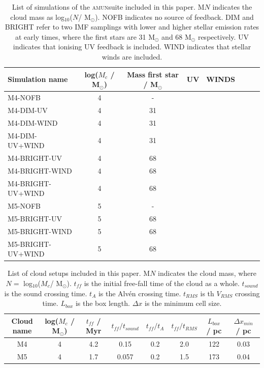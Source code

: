 \documentclass[a4paper,fleqn,usenatbib]{mnras}
\newcommand{\Msolar}{M$_{\odot}$\xspace}
\newcommand{\AMUN}{\textsc{amun}}
\newcommand{\tick}{\hspace{1pt}\ding{51}}
\newcommand{\cross}{\hspace{1pt}\ding{55}}
\begin{document}
\begin{table}
	\centering
	\caption{List of simulations of the \AMUN suite included in this paper. M$N$ indicates the cloud mass as log$_{10}$($N$/ \Msolar). NOFB indicates no source of feedback. DIM and BRIGHT refer to two IMF samplings with lower and higher stellar emission rates at early times, where the first stars are 31 \Msolar and 68 \Msolar respectively. UV indicates that ionising UV feedback is included. WIND indicates that stellar winds are included.}
	\label{methods:simtable}
	\begin{tabular}{lccccccc} %
		\hline
		Simulation name & log($M_c$ / M$_\odot$) & Mass first star / M$_\odot$ & UV & WINDS \\
		\hline
		\hline
		M4-NOFB                & 4  & - & \cross & \cross \\
		M4-DIM-UV              & 4  & 31 & \tick  & \cross \\
		M4-DIM-WIND            & 4  & 31 & \cross & \tick  \\
		M4-DIM-UV+WIND         & 4  & 31 & \tick  & \tick  \\
		\hline
		M4-BRIGHT-UV           & 4  & 68 & \tick  & \cross \\
		M4-BRIGHT-WIND         & 4  & 68 & \cross & \tick  \\
		M4-BRIGHT-UV+WIND      & 4  & 68 & \tick  & \tick  \\
		\hline
		M5-NOFB                & 5  & - & \cross & \cross \\
		M5-BRIGHT-UV           & 5  & 68 & \tick  & \cross \\
		M5-BRIGHT-WIND         & 5  & 68 & \cross & \tick  \\
		M5-BRIGHT-UV+WIND      & 5  & 68 & \tick  & \tick  \\
		\hline
	\end{tabular}
\end{table}

\begin{table}
	\centering
	\caption{List of cloud setups included in this paper. M$N$ indicates the cloud mass, where $N=$ log$_{10}$($M_c$/ \Msolar). $t_{ff}$ is the initial free-fall time of the cloud as a whole. $t_{sound}$ is the sound crossing time. $t_{A}$ is the Alv\'en crossing time. $t_{RMS}$ is th $V_{RMS}$ crossing time. $L_{box}$ is the box length. $\Delta x$ is the minimum cell size.}
	\label{methods:cloudtable}
	\begin{tabular}{cccccccc} %
		\hline
		Cloud name & log($M_c$ / M$_\odot$) & $t_{ff}$ / Myr & $t_{ff}/t_{sound}$ & $t_{ff}/t_{A}$ & $t_{ff}/t_{RMS}$ & $L_{box}$ / pc & $\Delta x_{min}$ / pc \\
		\hline
		M4         & 4                           & 4.2            & 0.15               & 0.2            & 2.0              & 122            & 0.03 \\
		M5         & 4                           & 1.7            & 0.057             & 0.2            & 1.5              & 173            & 0.04 \\
	\end{tabular}
\end{table}
\end{document}
